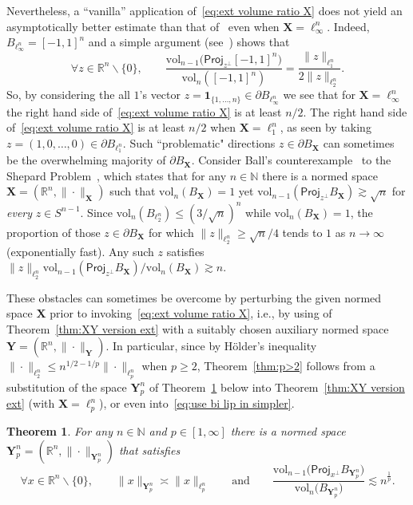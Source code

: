 \documentclass[11pt,reqno]{amsart}
\renewcommand{\le}{\leqslant}
\renewcommand{\ge}{\geqslant}
\renewcommand{\setminus}{\smallsetminus}
\newcommand{\proj}{\mathsf{Proj}}
\newcommand{\n}{\{1,\ldots,n\}}
\newcommand{\X}{\mathbf X}
\newcommand{\Y}{\mathbf Y}
\newcommand{\R}{\mathbb R}
\newtheorem{theorem}{Theorem}
\theoremstyle{remark}
\newcommand{\N}{\mathbb N}
\newcommand{\vol}{\mathrm{vol}}
\renewcommand{\1}{\mathbf 1}
\begin{document}
Nevertheless, a ``vanilla'' application of~\eqref{eq:ext volume ratio X} does not yield an asymptotically  better estimate than that of~\cite{JLS86}  even when $\X=\ell_\infty^n$. Indeed, $B_{\ell_\infty^n}=[-1,1]^n$ and a simple argument (see~\cite{CF86}) shows that
\begin{equation}\label{eq:ell infty proj formula}
\forall z\in \R^n\setminus\{0\},\qquad \frac{\vol_{n-1}\big(\proj_{z^\perp}[-1,1]^n\big)}{\vol_n([-1,1]^n)}=\frac{\|z\|_{\ell_1^n}}{2\|z\|_{\ell_2^n}}.
\end{equation} So, by considering the all $1$'s vector  $z=\1_{\n}\in \partial B_{\ell_\infty^n}$ we see that for $\X=\ell_\infty^n$ the right hand side of~\eqref{eq:ext volume ratio X} is at least $n/2$. The right hand side of~\eqref{eq:ext volume ratio X}  is  at least $n/2$ when $\X=\ell_1^n$, as seen by taking  $z=(1,0,\ldots,0)\in \partial B_{\ell_1^n}$. Such ``problematic" directions $z\in \partial B_{\X}$ can sometimes be the overwhelming majority of $\partial B_{\X}$. Consider Ball's counterexample~\cite{Bal91} to the Shepard Problem~\cite{She64}, which states that for any $n\in \N$ there is a normed space $\X=(\R^n,\|\cdot\|_{\X})$ such that $\vol_n(B_{\X})=1$ yet $\vol_{n-1}(\proj_{z^\perp}B_{\X})\gtrsim \sqrt{n}$ for {\em every} $z\in S^{n-1}$. Since $\vol_n(B_{\ell_2^n})\le (3/\sqrt{n})^n$ while $\vol_n(B_{\X})= 1$,  the proportion of those $z\in  \partial B_{\X}$ for which $\|z\|_{\ell_2^n}\ge\sqrt{n}/4$ tends to $1$ as $n\to\infty$ (exponentially fast). Any such $z$ satisfies $\|z\|_{\ell_2^n}\vol_{n-1}(\proj_{z^\perp}B_{\X})/\vol_n(B_{\X})\gtrsim n$.

These obstacles can sometimes be overcome by perturbing the given normed space $\X$ prior to invoking~\eqref{eq:ext volume ratio X}, i.e., by using of Theorem~\ref{thm:XY version ext}  with a suitably chosen auxiliary normed space $\Y=(\R^n,\|\cdot\|_\Y)$. In particular, since by H\"older's inequality $\|\cdot\|_{\ell_2^n}\le n^{1/2-1/p}\|\cdot\|_{\ell_p^n}$ when $p\ge 2$, Theorem~\ref{thm:p>2} follows from a substitution of the space $\Y_p^n$ of Theorem~\ref{prop:rounded cube} below into Theorem~\ref{thm:XY version ext} (with $\X=\ell_p^n$), or even into~\eqref{eq:use bi lip in simpler}.












\begin{theorem}\label{prop:rounded cube} For any $n\in \N$ and $p\in [1,\infty]$ there is a normed space $\Y_p^n=(\R^n,\|\cdot\|_{\Y_p^n})$ that satisfies
\begin{equation}\label{eq:round cube}
\forall x\in \R^n\setminus \{0\},\qquad  \|x\|_{\Y_p^n}\asymp \|x\|_{\ell_p^n}\qquad \mathrm{and}\qquad \frac{\vol_{n-1}\big(\proj_{x^\perp}B_{\Y_p^n}\big)}{\vol_n\big(B_{\Y_p^n}\big)}\lesssim n^{\frac{1}{p}}.
\end{equation}
\end{theorem}
\end{document}
